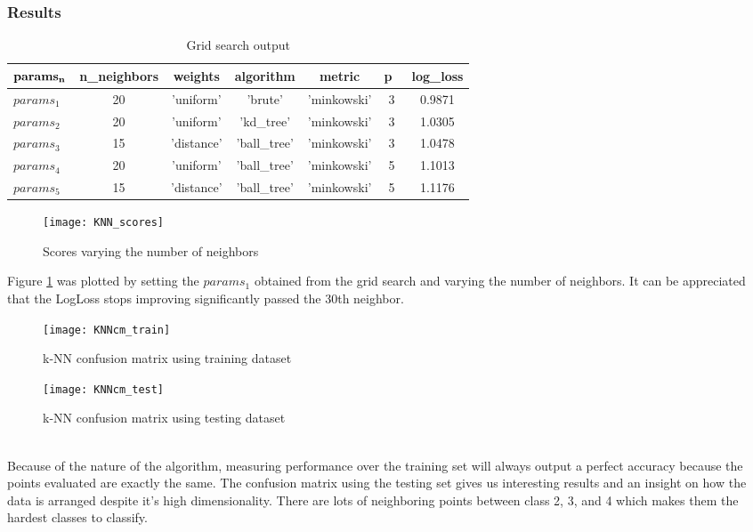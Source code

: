 \subsubsection{Results}
\begin{table}[h!]
	\caption{Grid search output}
	\centering
	\begin{tabular}{ | l | c | c | c | c | c | c |}
		\hline
		$\bf{params_n}$ & \bf{n\_neighbors} & \bf{weights} & \bf{algorithm} & \bf{metric} & \bfseries{p}\  & \bfseries{log\_loss} \\ \hline
		$params_1$ & 20 & 'uniform' & 'brute' & 'minkowski' & 3 & 0.9871  \\ \hline
		$params_2$ & 20 & 'uniform' & 'kd\_tree' & 'minkowski' & 3 & 1.0305 \\ \hline
		$params_3$ & 15 & 'distance' & 'ball\_tree' & 'minkowski' & 3 & 1.0478 \\ \hline
		$params_4$ & 20 & 'uniform' & 'ball\_tree' & 'minkowski' & 5 & 1.1013 \\ \hline
		$params_5$ & 15 & 'distance' & 'ball\_tree' & 'minkowski' & 5 & 1.1176 \\ \hline
	\end{tabular}
\end{table}
\begin{figure}[h!]
	\centering
	\texttt{[image: KNN\_scores]}
	\caption{Scores varying the number of neighbors}
	\label{fig:KNN_scores}
\end{figure}
Figure \ref{fig:KNN_scores} was plotted by setting the $params_1$ obtained from the grid search and varying the number of neighbors. It can be appreciated that the LogLoss stops improving significantly passed the 30th neighbor.\\
\begin{figure}[h!]
	\centering
	\texttt{[image: KNNcm\_train]}
	\caption{k-NN confusion matrix using training dataset}
	\label{fig:KNNcm_train}
\end{figure}
\begin{figure}[h!]
	\centering
	\texttt{[image: KNNcm\_test]}
	\caption{k-NN confusion matrix using testing dataset}
	\label{fig:KNNcm_test}
\end{figure}\\
Because of the nature of the algorithm, measuring performance over the training set will always output a perfect accuracy because the points evaluated are exactly the same. The confusion matrix using the testing set gives us interesting results and an insight on how the data is arranged despite it's high dimensionality. There are lots of neighboring points between class 2, 3, and 4 which makes them the hardest classes to classify.\\